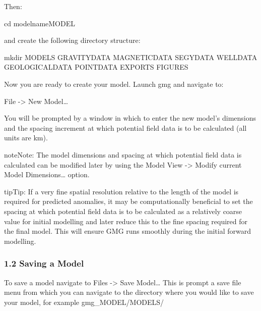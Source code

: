 \documentclass[a4paper,10pt,english]{sphinxmanual}
\begin{document}
Then:

%
\begin{sphinxVerbatim}[commandchars=\\\{\}]
cd model\PYGZhy{}name\PYGZus{}MODEL
\end{sphinxVerbatim}

and create the following directory structure:

%
\begin{sphinxVerbatim}[commandchars=\\\{\}]
mkdir MODELS GRAVITY\PYGZus{}DATA MAGNETIC\PYGZus{}DATA SEGY\PYGZus{}DATA WELL\PYGZus{}DATA GEOLOGICAL\PYGZus{}DATA POINT\PYGZus{}DATA EXPORTS FIGURES
\end{sphinxVerbatim}

Now you are ready to create your model. Launch gmg and navigate to:

File -\textgreater{} New Model…

You will be prompted by a window in which to enter the new model’s dimensions and the spacing
increment at which potential field data is to be calculated (all units are km).

\begin{sphinxadmonition}{note}{Note:}
The model dimensions and spacing at which potential field data is calculated can be modified later by using the
Model View -\textgreater{} Modify current Model Dimensions… option.
\end{sphinxadmonition}

\begin{sphinxadmonition}{tip}{Tip:}
If a very fine spatial resolution relative to the length of the model is required for predicted anomalies, it may
be computationally beneficial to set the  spacing at which potential field data is to be calculated as a relatively
coarse value for initial modelling and later reduce this to the fine spacing required for the final model. This will
ensure GMG runs smoothly during the initial forward modelling.
\end{sphinxadmonition}

\begin{DUlineblock}{0em}
\item[] 
\end{DUlineblock}


\subsubsection{1.2 Saving a Model}
\label{\detokenize{manual_models:saving-a-model}}
To save a model navigate to Files -\textgreater{} Save Model…
This is prompt a save file menu from which you can navigate to the directory where you would like to save your model,
for example gmg\_MODEL/MODELS/
\end{document}
